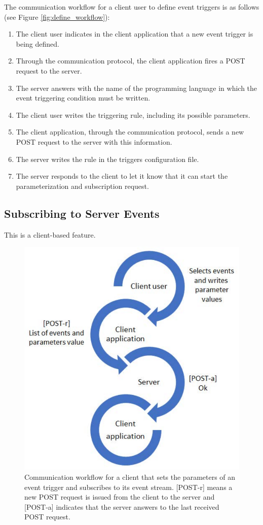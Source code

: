 The communication workflow for a client user to define event triggers is as follows (see Figure \ref{fig:define_workflow}):

\begin{enumerate}
	\item The client user indicates in the client application that a new event trigger is being defined. 
	\item Through the communication protocol, the client application fires a POST request to the server.
	\item The server answers with the name of the programming language in which the event triggering condition must be written.
	\item The client user writes the triggering rule, including its possible parameters.
	\item The client application, through the communication protocol, sends a new POST request to the server with this information.
	\item The server writes the rule in the triggers configuration file.
	\item The server responds to the client to let it know that it can start the parameterization and subscription request.
\end{enumerate}

\subsection{Subscribing to Server Events}
This is a client-based feature. 

\begin{figure}[b!]
\begin{center}
\centering
\includegraphics[width=0.4\columnwidth]{images/workflow_subscribe.pdf}
\caption{Communication workflow for a client that sets the parameters of an event trigger and subscribes to its event stream. [POST-r] means a new POST request is issued from the client to the server and [POST-a] indicates that the server answers to the last received POST request.}
\label{fig:subscribe_workflow}
\end{center}
\end{figure}


